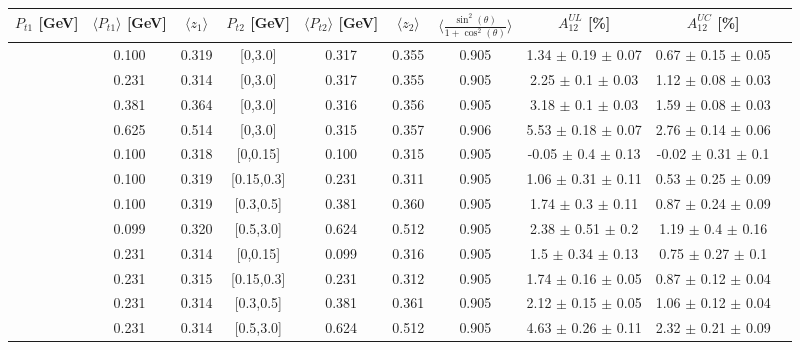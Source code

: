 \documentclass[aps,prX,preprint,groupedaddress,linenumbers]{revtex4-1}
\begin{document}
\begin{table}[H]\footnotesize
\centering
\renewcommand{\arraystretch}{1.5}
\begin{tabular}{|c| c| c| c| c| c| c| c| c| c|}
\hline
$P_{t1}$  [GeV]  & $\langle  P_{t1} \rangle$  [GeV]  & $\langle  z_{1}  \rangle$ & $P_{t2}$  [GeV] &  $\langle  P_{t2}\rangle$  [GeV]  & $\langle  z_{2}\rangle$ &$\langle\frac{\sin^2(\theta)}{1+\cos^2(\theta)}\rangle$ &$A_{12}^{UL}$ [\%] &  $A_{12}^{UC}$ [\%]   \\ \hline
[0,0.15]	&	0.100	&	0.319	&	[0,3.0]	&	0.317	&	0.355	&	0.905	& 1.34  $\pm$ 0.19  $\pm$ 0.07 & 0.67  $\pm$ 0.15  $\pm$ 0.05 \\ \hline
[0.15,0.3]	&	0.231	&	0.314	&	[0,3.0]	&	0.317	&	0.355	&	0.905	& 2.25  $\pm$ 0.1  $\pm$ 0.03  & 1.12  $\pm$ 0.08  $\pm$ 0.03 \\ \hline
[0.3,0.5]	&	0.381	&	0.364	&	[0,3.0]	&	0.316	&	0.356	&	0.905	& 3.18  $\pm$ 0.1  $\pm$ 0.03  & 1.59  $\pm$ 0.08  $\pm$ 0.03 \\ \hline
[0.5,3.0]	&	0.625	&	0.514	&	[0,3.0]	&	0.315	&	0.357	&	0.906	& 5.53  $\pm$ 0.18  $\pm$ 0.07 & 2.76  $\pm$ 0.14  $\pm$ 0.06 \\ \hline
\hline
[0,0.15]	&	0.100	&	0.318	&	[0,0.15]	&	0.100	&	0.315	&	0.905	&-0.05  $\pm$ 0.4  $\pm$ 0.13  & -0.02  $\pm$ 0.31  $\pm$ 0.1 \\ \hline
[0,0.15]	&	0.100	&	0.319	&	[0.15,0.3]	&	0.231	&	0.311	&	0.905	&1.06  $\pm$ 0.31  $\pm$ 0.11  & 0.53  $\pm$ 0.25  $\pm$ 0.09 \\ \hline
[0,0.15]	&	0.100	&	0.319	&	[0.3,0.5]	&	0.381	&	0.360	&	0.905	&1.74  $\pm$ 0.3  $\pm$ 0.11   & 0.87  $\pm$ 0.24  $\pm$ 0.09 \\ \hline
[0,0.15]	&	0.099	&	0.320	&	[0.5,3.0]	&	0.624	&	0.512	&	0.905	&2.38  $\pm$ 0.51  $\pm$ 0.2   & 1.19  $\pm$ 0.4  $\pm$ 0.16  \\ \hline
\hline
[0.15,0.3]	&	0.231	&	0.314	&	[0,0.15]	&	0.099	&	0.316	&	0.905	&1.5  $\pm$ 0.34  $\pm$ 0.13   & 0.75  $\pm$ 0.27  $\pm$ 0.1  \\ \hline
[0.15,0.3]	&	0.231	&	0.315	&	[0.15,0.3]	&	0.231	&	0.312	&	0.905	&1.74  $\pm$ 0.16  $\pm$ 0.05  & 0.87  $\pm$ 0.12  $\pm$ 0.04 \\ \hline
[0.15,0.3]	&	0.231	&	0.314	&	[0.3,0.5]	&	0.381	&	0.361	&	0.905	&2.12  $\pm$ 0.15  $\pm$ 0.05  & 1.06  $\pm$ 0.12  $\pm$ 0.04 \\ \hline
[0.15,0.3]	&	0.231	&	0.314	&	[0.5,3.0]	&	0.624	&	0.512	&	0.905	&4.63  $\pm$ 0.26  $\pm$ 0.11  & 2.32  $\pm$ 0.21  $\pm$ 0.09 \\ \hline

\end{tabular}
\end{table}
\end{document}

